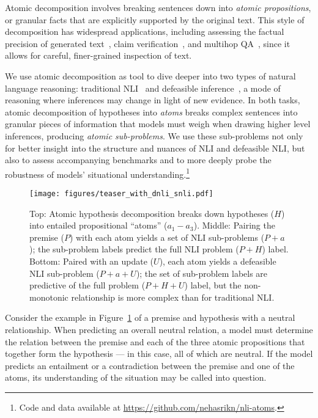 Atomic decomposition involves breaking sentences down into \textit{atomic propositions}, or granular facts that are explicitly supported by the original text.
%
This style of decomposition has widespread applications, including assessing the factual precision of generated text~\cite{min-etal-2023-factscore}, claim verification~\cite{chen-etal-2024-complex}, and multihop QA~\cite{perez-etal-2020-unsupervised}, since it allows for careful, finer-grained inspection of text.

We use atomic decomposition as tool to dive deeper into two types of natural language reasoning: traditional NLI~\cite{giampiccolo2007third} and defeasible inference~\cite{rudinger-etal-2020-thinking}, a mode of reasoning where inferences may change in light of new evidence.
%
In both tasks, atomic decomposition of hypotheses into \textit{atoms} breaks complex sentences into granular pieces of information that models must weigh when drawing higher level inferences, producing \textit{atomic sub-problems}.
%
We use these sub-problems not only for better insight into the structure and nuances of NLI and defeasible NLI, but also to assess accompanying benchmarks and to more deeply probe the robustness of models' situational understanding.\footnote{Code and data available at \url{https://github.com/nehasrikn/nli-atoms}.}
%

\begin{figure}[t!]
\centering
\texttt{[image: figures/teaser\_with\_dnli\_snli.pdf]}
\caption{Top: Atomic hypothesis decomposition breaks down hypotheses ($H$) into  entailed propositional ``atoms'' ($a_1-a_3$). Middle: Pairing the premise ($P$) with each atom yields a set of NLI sub-problems ($P+a$); the sub-problem labels predict the full NLI problem ($P+H$) label. Bottom: Paired with an update ($U$), each atom yields a defeasible NLI sub-problem ($P+a+U$); the set of sub-problem labels are predictive of the full problem ($P+H+U$) label, but the non-monotonic relationship is more complex than for traditional NLI.}
\label{fig:teaser-example}
\end{figure}


Consider the example in Figure~\ref{fig:teaser-example} of a premise and hypothesis with a neutral relationship. 
%
When predicting an overall neutral relation, a model must determine the relation between the premise and each of the three atomic propositions that together form the hypothesis --- in this case, all of which are neutral.
%
If the model predicts an entailment or a contradiction between the premise and one of the atoms, its understanding of the situation may be called into question.

